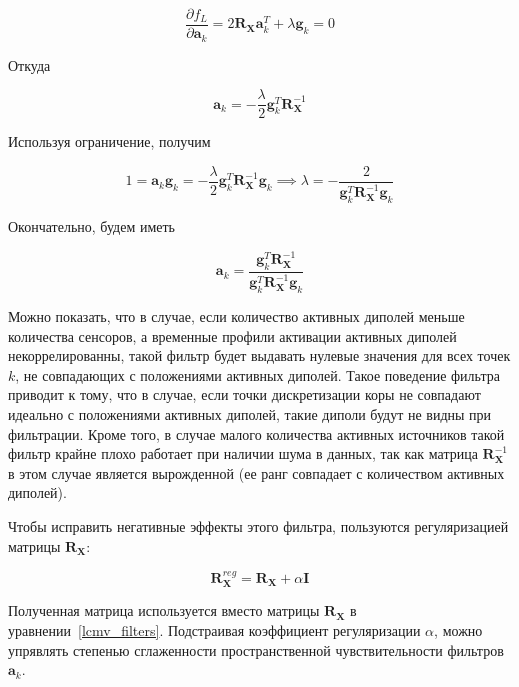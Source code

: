 \begin{equation}
    \frac{\partial f_L}{\partial \mathbf{a}_k} = 
    2 \mathbf{R}_{\mathbf{X}} \mathbf{a}_k^T + \lambda \mathbf{g}_k = 0
\end{equation}

Откуда

\begin{equation}
    \mathbf{a}_k = - \frac{\lambda}{2} \mathbf{g}_k^T\mathbf{R}_{\mathbf{X}}^{-1}
\end{equation}

Используя ограничение, получим

\begin{equation}
    1 = \mathbf{a}_k \mathbf{g}_k =
    - \frac{\lambda}{2} \mathbf{g}_k^T\mathbf{R}_{\mathbf{X}}^{-1} \mathbf{g}_k \implies
    \lambda = -\frac{2}{\mathbf{g}_k^T \mathbf{R}_{\mathbf{X}}^{-1} \mathbf{g}_k}
\end{equation}

Окончательно, будем иметь

\begin{equation}
    \mathbf{a}_k =
    \frac{\mathbf{g}_k^T \mathbf{R}_{\mathbf{X}}^{-1}}{\mathbf{g}_k^T \mathbf{R}_{\mathbf{X}}^{-1} \mathbf{g}_k}
    \label{lcmv_filters}
\end{equation}

Можно показать, что в случае, если количество активных диполей меньше количества сенсоров,
а временные профили активации активных диполей некоррелированны,
такой фильтр будет выдавать нулевые значения для всех точек $k$, не совпадающих
с положениями активных диполей.
Такое поведение фильтра приводит к тому, что в случае, если точки дискретизации коры не
совпадают идеально с положениями активных диполей, такие диполи будут не видны при
фильтрации.
Кроме того, в случае малого количества активных источников такой фильтр
крайне плохо работает при наличии шума в данных, так как матрица $\mathbf{R}_{\mathbf{X}}^{-1}$
в этом случае является вырожденной (ее ранг совпадает с количеством активных диполей).

Чтобы исправить негативные эффекты этого фильтра, пользуются регуляризацией матрицы $\mathbf{R}_{\mathbf{X}}$:

\begin{equation}
    \mathbf{R}_{\mathbf{X}}^{reg} = \mathbf{R}_\mathbf{X} + \alpha \mathbf{I}
\end{equation}

Полученная матрица используется вместо матрицы $\mathbf{R}_\mathbf{X}$ в
уравнении~\ref{lcmv_filters}. Подстраивая коэффициент регуляризации $\alpha$, можно упрявлять степенью
сглаженности пространственной чувствительности фильтров $\mathbf{a}_k$.


